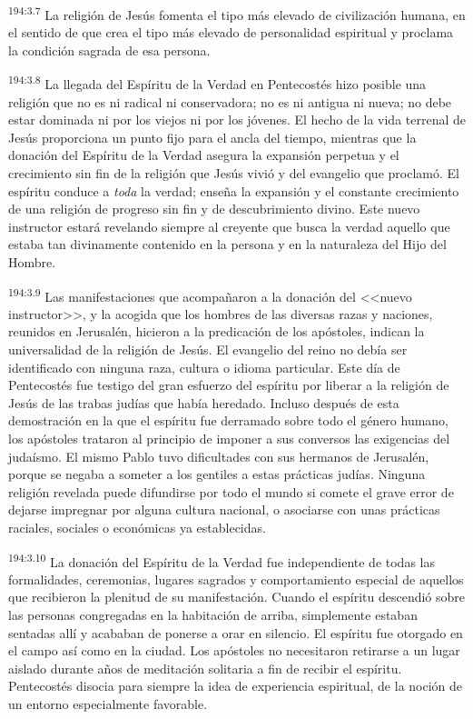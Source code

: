 \par 
\textsuperscript{194:3.7} La religión de Jesús fomenta el tipo más elevado de civilización humana, en el sentido de que crea el tipo más elevado de personalidad espiritual y proclama la condición sagrada de esa persona.

\par 
\textsuperscript{194:3.8} La llegada del Espíritu de la Verdad en Pentecostés hizo posible una religión que no es ni radical ni conservadora; no es ni antigua ni nueva; no debe estar dominada ni por los viejos ni por los jóvenes. El hecho de la vida terrenal de Jesús proporciona un punto fijo para el ancla del tiempo, mientras que la donación del Espíritu de la Verdad asegura la expansión perpetua y el crecimiento sin fin de la religión que Jesús vivió y del evangelio que proclamó. El espíritu conduce a \textit{toda} la verdad; enseña la expansión y el constante crecimiento de una religión de progreso sin fin y de descubrimiento divino. Este nuevo instructor estará revelando siempre al creyente que busca la verdad aquello que estaba tan divinamente contenido en la persona y en la naturaleza del Hijo del Hombre.

\par 
\textsuperscript{194:3.9} Las manifestaciones que acompañaron a la donación del <<nuevo instructor>>, y la acogida que los hombres de las diversas razas y naciones, reunidos en Jerusalén, hicieron a la predicación de los apóstoles, indican la universalidad de la religión de Jesús. El evangelio del reino no debía ser identificado con ninguna raza, cultura o idioma particular. Este día de Pentecostés fue testigo del gran esfuerzo del espíritu por liberar a la religión de Jesús de las trabas judías que había heredado. Incluso después de esta demostración en la que el espíritu fue derramado sobre todo el género humano, los apóstoles trataron al principio de imponer a sus conversos las exigencias del judaísmo. El mismo Pablo tuvo dificultades con sus hermanos de Jerusalén, porque se negaba a someter a los gentiles a estas prácticas judías. Ninguna religión revelada puede difundirse por todo el mundo si comete el grave error de dejarse impregnar por alguna cultura nacional, o asociarse con unas prácticas raciales, sociales o económicas ya establecidas.

\par 
\textsuperscript{194:3.10} La donación del Espíritu de la Verdad fue independiente de todas las formalidades, ceremonias, lugares sagrados y comportamiento especial de aquellos que recibieron la plenitud de su manifestación. Cuando el espíritu descendió sobre las personas congregadas en la habitación de arriba, simplemente estaban sentadas allí y acababan de ponerse a orar en silencio. El espíritu fue otorgado en el campo así como en la ciudad. Los apóstoles no necesitaron retirarse a un lugar aislado durante años de meditación solitaria a fin de recibir el espíritu. Pentecostés disocia para siempre la idea de experiencia espiritual, de la noción de un entorno especialmente favorable.


